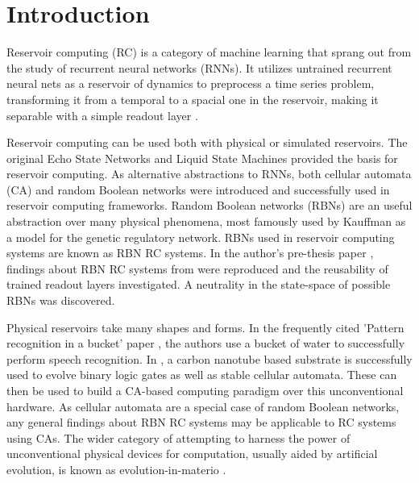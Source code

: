 \chapter{Introduction}

Reservoir computing (RC) is a category of machine learning that sprang out from the study of recurrent neural networks (RNNs).
It utilizes untrained recurrent neural nets as a reservoir of dynamics to preprocess a time series problem,
transforming it from a temporal to a spacial one in the reservoir,
making it separable with a simple readout layer \cite{lukovsevivcius2012reservoir}.

Reservoir computing can be used both with physical or simulated reservoirs.
The original Echo State Networks \cite{jaeger2002adaptive} and Liquid State Machines \cite{natschlager2002liquid} provided the basis for reservoir computing.
As alternative abstractions to RNNs,
both cellular automata (CA) \cite{yilmaz2014reservoir} and random Boolean networks \cite{rbn-reservoir} were introduced and successfully used in reservoir computing frameworks.
Random Boolean networks (RBNs) \cite{gershenson2004introduction} are an useful abstraction over many physical phenomena,
most famously used by Kauffman \cite{kauffman1969metabolic} as a model for the genetic regulatory network.
RBNs used in reservoir computing systems are known as RBN RC systems.
In the author's pre-thesis paper \cite{burkow2015evolving},
findings about RBN RC systems from \cite{rbn-reservoir} were reproduced and the reusability of trained readout layers investigated.
A neutrality in the state-space of possible RBNs was discovered.

Physical reservoirs take many shapes and forms.
In the frequently cited 'Pattern recognition in a bucket' paper \cite{fernando2003pattern},
the authors use a bucket of water to successfully perform speech recognition.
In \cite{farstad2015evolving},
a carbon nanotube based substrate is successfully used to evolve binary logic gates as well as stable cellular automata.
These can then be used to build a CA-based computing paradigm over this unconventional hardware.
As cellular automata are a special case of random Boolean networks,
any general findings about RBN RC systems may be applicable to RC systems using CAs.
The wider category of attempting to harness the power of unconventional physical devices for computation,
usually aided by artificial evolution,
is known as evolution-in-materio \cite{miller2002evolution}.


